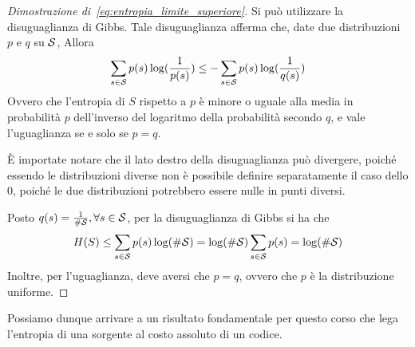 \begin{proof}[Dimostrazione di~\ref{eq:entropia_limite_superiore}]
  Si può utilizzare la disuguaglianza di Gibbs.
  Tale disuguaglianza afferma che, date due distribuzioni \(p\) e \(q\) su \(\mathcal{S}\), Allora
  \[ \sum_{s \in \mathcal{S}} p(s) \log(\frac{1}{p(s)}) \leq -\sum_{s \in \mathcal{S}} p(s) \log(\frac{1}{q(s)})\]
  Ovvero che l'entropia di \(S\) rispetto a \(p\) è minore o uguale alla media in probabilità \(p\) dell'inverso del logaritmo della probabilità secondo \(q\), e vale l'uguaglianza se e solo se \(p = q\).
  \begin{note}{}
    È importate notare che il lato destro della disuguaglianza può divergere, poiché essendo le distribuzioni diverse non è possibile definire separatamente il caso dello \(0\), poiché le due distribuzioni potrebbero essere nulle in punti diversi.
  \end{note}
  Posto \(q(s) = \frac{1}{\#\mathcal{S}}, \forall s \in \mathcal{S}\), per la disuguaglianza di Gibbs si ha che
  \[H(S) \leq \sum_{s \in \mathcal{S}} p(s) \log(\#\mathcal{S}) = \log(\#\mathcal{S})\sum_{s \in \mathcal{S}} p(s) = \log(\#\mathcal{S})\]
  Inoltre, per l'uguaglianza, deve aversi che \(p = q\), ovvero che \(p\) è la distribuzione uniforme.
\end{proof}

Possiamo dunque arrivare a un risultato fondamentale per questo corso che lega l'entropia di una sorgente al costo assoluto di un codice.

